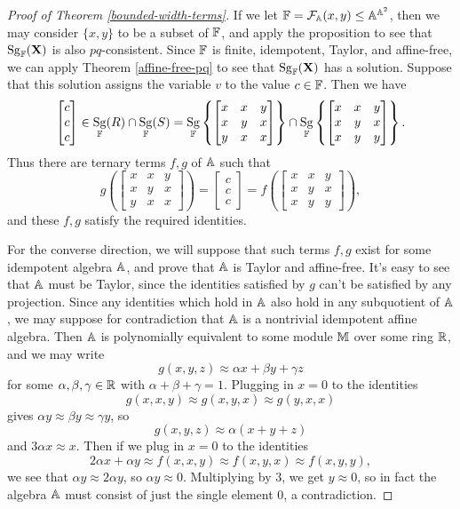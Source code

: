 \documentclass[letterpaper,11pt]{article}
\DeclareMathOperator{\Sg}{Sg}
\begin{document}
\begin{proof}[Proof of Theorem \ref{bounded-width-terms}]
If we let $\mathbb{F} = \mathcal{F}_{\mathbb{A}}(x,y) \le \mathbb{A}^{\mathbb{A}^2}$, then we may consider $\{x,y\}$ to be a subset of $\mathbb{F}$, and apply the proposition to see that $\Sg_\bF(\fX)$ is also $pq$-consistent. Since $\mathbb{F}$ is finite, idempotent, Taylor, and affine-free, we can apply Theorem \ref{affine-free-pq} to see that $\Sg_\bF(\fX)$ has a solution. Suppose that this solution assigns the variable $v$ to the value $c \in \mathbb{F}$. Then we have
\[
\begin{bmatrix} c\\ c\\ c\end{bmatrix} \in \Sg_\bF(R) \cap \Sg_\bF(S) = \Sg_\bF\left\{\begin{bmatrix} x & x & y\\ x & y & x\\ y & x & x\end{bmatrix}\right\} \cap \Sg_\bF\left\{\begin{bmatrix} x & x & y\\ x & y & x\\ x & y & y\end{bmatrix}\right\}.
\]
Thus there are ternary terms $f,g$ of $\mathbb{A}$ such that
\[
g\left(\begin{bmatrix} x & x & y\\ x & y & x\\ y & x & x\end{bmatrix}\right) = \begin{bmatrix} c\\ c\\ c\end{bmatrix} = f\left(\begin{bmatrix} x & x & y\\ x & y & x\\ x & y & y\end{bmatrix}\right),
\]
and these $f,g$ satisfy the required identities.

For the converse direction, we will suppose that such terms $f,g$ exist for some idempotent algebra $\mathbb{A}$, and prove that $\mathbb{A}$ is Taylor and affine-free. It's easy to see that $\mathbb{A}$ must be Taylor, since the identities satisfied by $g$ can't be satisfied by any projection. Since any identities which hold in $\mathbb{A}$ also hold in any subquotient of $\mathbb{A}$, we may suppose for contradiction that $\mathbb{A}$ is a nontrivial idempotent affine algebra. Then $\mathbb{A}$ is polynomially equivalent to some module $\mathbb{M}$ over some ring $\mathbb{R}$, and we may write
\[
g(x,y,z) \approx \alpha x + \beta y + \gamma z
\]
for some $\alpha,\beta,\gamma \in \mathbb{R}$ with $\alpha+\beta+\gamma = 1$. Plugging in $x = 0$ to the identities
\[
g(x,x,y) \approx g(x,y,x) \approx g(y,x,x)
\]
gives $\alpha y \approx \beta y \approx \gamma y$, so
\[
g(x,y,z) \approx \alpha(x+y+z)
\]
and $3\alpha x \approx x$. Then if we plug in $x = 0$ to the identities
\[
2\alpha x + \alpha y \approx f(x,x,y) \approx f(x,y,x) \approx f(x,y,y),
\]
we see that $\alpha y \approx 2\alpha y$, so $\alpha y \approx 0$. Multiplying by $3$, we get $y \approx 0$, so in fact the algebra $\mathbb{A}$ must consist of just the single element $0$, a contradiction.
\end{proof}
\end{document}
